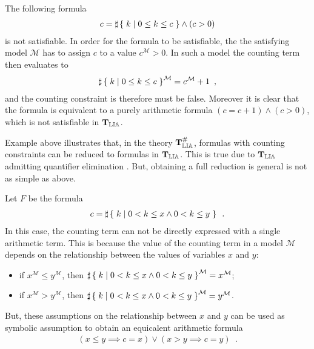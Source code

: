 \begin{example}
\label{ex:simple}
The following formula
\begin{align*}
  c = \sharp\left\lbrace\;k\;|\;0 \le k \le c\;\right\rbrace \land (c > 0)
\end{align*}
is not satisfiable. In order for the formula to be satisfiable, the
the satisfying model $\mathcal{M}$ has to assign $c$ to a value
$c^\mathcal{M} > 0$. In such a model the counting term then evaluates to
\begin{align*}
  \sharp\left\lbrace\;k\;|\;0 \le k \le c\;\right\rbrace^\mathcal{M} = c^\mathcal{M} + 1\enspace,
\end{align*}
and the counting constraint is therefore must be false. Moreover it
is clear that the formula is equivalent to a purely arithmetic
formula $(c=c+1) \land (c>0)$, which is not satisfiable in $\operatorname{\mathbf{T}_{\mathbb{LIA}}}$.
\end{example}

Example above illustrates that, in the theory $\operatorname{\mathbf{T}^\#_{\mathbb{LIA}}}$, formulas with
counting constraints can be reduced to formulas in $\operatorname{\mathbf{T}_{\mathbb{LIA}}}$. This is
true due to $\operatorname{\mathbf{T}_{\mathbb{LIA}}}$ admitting quantifier elimination \cite{schweikardt}.
But, obtaining a full reduction is general is not as simple as above.

\begin{example}
\label{ex:disjunction}
Let  $F$ be the formula
\begin{align*}
  c = \sharp\left\lbrace\;k\;|\;0 < k \le x \land 0 < k \le y\;\right\rbrace\enspace.
\end{align*}
In this case, the counting term can not be directly expressed with a
single arithmetic term. This is because the value of the counting term
in a model $\mathcal{M}$ depends on the relationship between the values
of variables $x$ and $y$:
\begin{itemize}
  \item if $x^\mathcal{M} \le y^\mathcal{M}$, then $\sharp\left\lbrace\;k\;|\;0 < k \le x \land 0 < k \le y\;\right\rbrace^\mathcal{M} = x^\mathcal{M}$;
  \item if $x^\mathcal{M} > y^\mathcal{M}$, then $\sharp\left\lbrace\;k\;|\;0 < k \le x \land 0 < k \le y\;\right\rbrace^\mathcal{M} = y^\mathcal{M}$.
\end{itemize}
But, these assumptions on the relationship between $x$ and $y$ can
be used as symbolic assumption to obtain an equicalent arithmetic
formula
\begin{align*}
  (x \le y \implies c = x) \lor (x > y \implies c = y)\enspace.
\end{align*}
\end{example}


